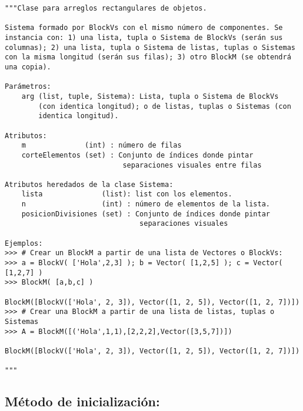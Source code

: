 \documentclass[11pt]{report}
\begin{document}
\begin{verbatim}
"""Clase para arreglos rectangulares de objetos.

Sistema formado por BlockVs con el mismo número de componentes. Se
instancia con: 1) una lista, tupla o Sistema de BlockVs (serán sus
columnas); 2) una lista, tupla o Sistema de listas, tuplas o Sistemas
con la misma longitud (serán sus filas); 3) otro BlockM (se obtendrá
una copia).

Parámetros:
    arg (list, tuple, Sistema): Lista, tupla o Sistema de BlockVs
        (con identica longitud); o de listas, tuplas o Sistemas (con
        identica longitud).

Atributos:
    m              (int) : número de filas
    corteElementos (set) : Conjunto de índices donde pintar
                            separaciones visuales entre filas

Atributos heredados de la clase Sistema:
    lista              (list): list con los elementos.
    n                  (int) : número de elementos de la lista.
    posicionDivisiones (set) : Conjunto de índices donde pintar
                                separaciones visuales

Ejemplos:
>>> # Crear un BlockM a partir de una lista de Vectores o BlockVs:
>>> a = BlockV( ['Hola',2,3] ); b = Vector( [1,2,5] ); c = Vector( [1,2,7] )
>>> BlockM( [a,b,c] )

BlockM([BlockV(['Hola', 2, 3]), Vector([1, 2, 5]), Vector([1, 2, 7])])
>>> # Crear una BlockM a partir de una lista de listas, tuplas o Sistemas
>>> A = BlockM([('Hola',1,1),[2,2,2],Vector([3,5,7])])

BlockM([BlockV(['Hola', 2, 3]), Vector([1, 2, 5]), Vector([1, 2, 7])])

"""
\end{verbatim}

\subsection{Método de inicialización:}
\label{sec:org9a04add}
\end{document}
